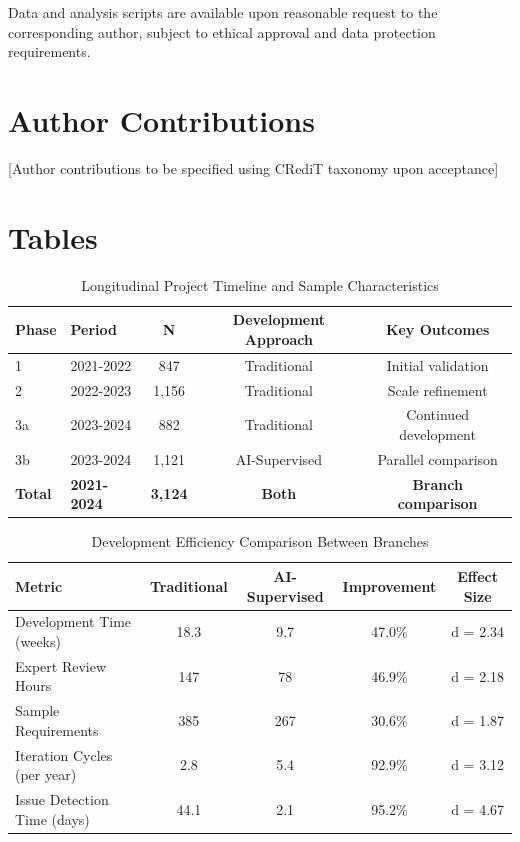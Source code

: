 \documentclass[12pt,a4paper]{article}
\begin{document}
Data and analysis scripts are available upon reasonable request to the corresponding author, subject to ethical approval and data protection requirements.

\section{Author Contributions}

[Author contributions to be specified using CRediT taxonomy upon acceptance]

\newpage




\newpage

\section{Tables}

\begin{table}[ht]
\centering
\caption{Longitudinal Project Timeline and Sample Characteristics}
\label{tab:project-timeline}
\begin{tabular}{llccc}
\toprule
Phase & Period & N & Development Approach & Key Outcomes \\
\midrule
1 & 2021-2022 & 847 & Traditional & Initial validation \\
2 & 2022-2023 & 1,156 & Traditional & Scale refinement \\
3a & 2023-2024 & 882 & Traditional & Continued development \\
3b & 2023-2024 & 1,121 & AI-Supervised & Parallel comparison \\
\midrule
\textbf{Total} & \textbf{2021-2024} & \textbf{3,124} & \textbf{Both} & \textbf{Branch comparison} \\
\bottomrule
\end{tabular}
\end{table}

\begin{table}[ht]
\centering
\caption{Development Efficiency Comparison Between Branches}
\label{tab:efficiency-comparison}
\begin{tabular}{lcccc}
\toprule
Metric & Traditional & AI-Supervised & Improvement & Effect Size \\
\midrule
Development Time (weeks) & 18.3 & 9.7 & 47.0\% & d = 2.34 \\
Expert Review Hours & 147 & 78 & 46.9\% & d = 2.18 \\
Sample Requirements & 385 & 267 & 30.6\% & d = 1.87 \\
Iteration Cycles (per year) & 2.8 & 5.4 & 92.9\% & d = 3.12 \\
Issue Detection Time (days) & 44.1 & 2.1 & 95.2\% & d = 4.67 \\
\bottomrule
\end{tabular}
\end{table}
\end{document}

